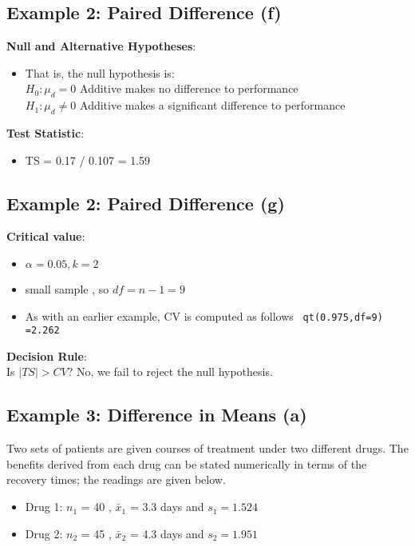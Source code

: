 \begin{frame}
\subsection*{Example 2: Paired Difference (f)}
\textbf{Null and Alternative Hypotheses}:
\begin{itemize}
\item That is, the null hypothesis is:\\
$H_0: \mu_d = 0$ Additive makes no difference to performance\\
$H_1: \mu_d \neq 0$ Additive makes a significant difference to performance \\
\end{itemize}
\textbf{Test Statistic}:
\begin{itemize}
\item TS = 0.17 / 0.107 = 1.59
\end{itemize}
\end{frame}

\begin{frame}
\subsection*{Example 2: Paired Difference (g)}
\textbf{Critical value}:
\begin{itemize}
\item $\alpha = 0.05, k = 2$ \item small sample , so $df = n-1 = 9$
\item As with an earlier example, CV is computed as follows \texttt{ qt(0.975,df=9) =2.262}
\end{itemize}
\bigskip
\textbf{Decision Rule}:\\
Is $|TS| > CV$? No, we fail to reject the null hypothesis.

\subsection*{Example 3: Difference in Means (a) }
Two sets of patients are given courses of treatment under two different drugs. The benefits
derived from each drug can be stated numerically in terms of the recovery times; the readings are given below.

\begin{itemize}
\item Drug 1:  $n_1$ = 40 , $\bar{x}_1$ = 3.3 days and $s_1 = 1.524$
\item Drug 2:  $n_2$ = 45 , $\bar{x}_2$ = 4.3 days and $s_2 = 1.951 $
\end{itemize}
\end{frame}

